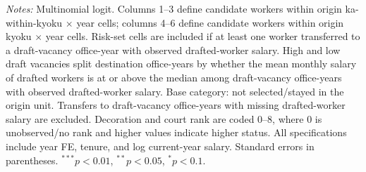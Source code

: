 \begin{table}[htbp]
\begin{threeparttable}
{\begin{tabular}{lcccccc}
\bottomrule
\end{tabular}}
\begin{tablenotes}[flushleft]\footnotesize
\item \textit{Notes:} Multinomial logit. Columns 1--3 define candidate workers within origin ka-within-kyoku $\times$ year cells; columns 4--6 define candidate workers within origin kyoku $\times$ year cells. Risk-set cells are included if at least one worker transferred to a draft-vacancy office-year with observed drafted-worker salary. High and low draft vacancies split destination office-years by whether the mean monthly salary of drafted workers is at or above the median among draft-vacancy office-years with observed drafted-worker salary. Base category: not selected/stayed in the origin unit. Transfers to draft-vacancy office-years with missing drafted-worker salary are excluded. Decoration and court rank are coded 0--8, where 0 is unobserved/no rank and higher values indicate higher status. All specifications include year FE, tenure, and log current-year salary. Standard errors in parentheses. $^{***}p<0.01$, $^{**}p<0.05$, $^{*}p<0.1$.
\end{tablenotes}\end{threeparttable}\end{table}
